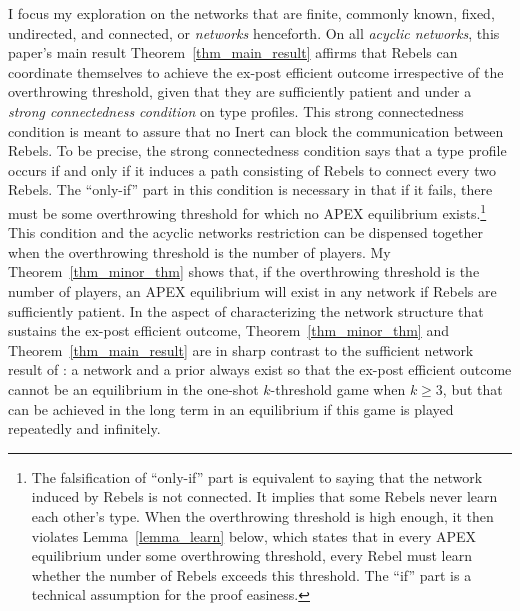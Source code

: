 \documentclass[12pt,letter]{article}
\theoremstyle{definition}
\theoremstyle{definition}
\theoremstyle{remark}
\theoremstyle{claim}
\begin{document}
I focus my exploration on the networks that are finite, commonly known, fixed, undirected, and connected, or \textit{networks} henceforth. On all \textit{acyclic networks}, this paper's main result Theorem~\ref{thm_main_result} affirms that Rebels can coordinate themselves to achieve the ex-post efficient outcome irrespective of the overthrowing threshold, given that they are sufficiently patient and under a \textit{strong connectedness condition} on type profiles. This strong connectedness condition is meant to assure that no Inert can block the communication between Rebels. To be precise, the strong connectedness condition says that a type profile occurs if and only if it induces a path consisting of Rebels to connect every two Rebels. The ``only-if'' part in this condition is necessary in that if it fails, there must be some overthrowing threshold for which no APEX equilibrium exists.\footnote{The falsification of ``only-if'' part is equivalent to saying that the network induced by Rebels is not connected. It implies that some Rebels never learn each other's type. When the overthrowing threshold is high enough, it then violates Lemma~\ref{lemma_learn} below, which states that in every APEX equilibrium under some overthrowing threshold, every Rebel must learn whether the number of Rebels exceeds this threshold. The ``if'' part is a technical assumption for the proof easiness.}
This condition and the acyclic networks restriction can be dispensed together when the overthrowing threshold is the number of players. My Theorem~\ref{thm_minor_thm} shows that, if the overthrowing threshold is the number of players, an APEX equilibrium will exist in any network if Rebels are sufficiently patient. In the aspect of characterizing the network structure that sustains the ex-post efficient outcome, Theorem~\ref{thm_minor_thm} and Theorem~\ref{thm_main_result} are in sharp contrast to the sufficient network result of \citep{Chwe2000}: a network and a prior always exist so that the ex-post efficient outcome cannot be an equilibrium in the one-shot $k$-threshold game when $k\geq 3$, but that can be achieved in the long term in an equilibrium if this game is played repeatedly and infinitely.
\end{document}

